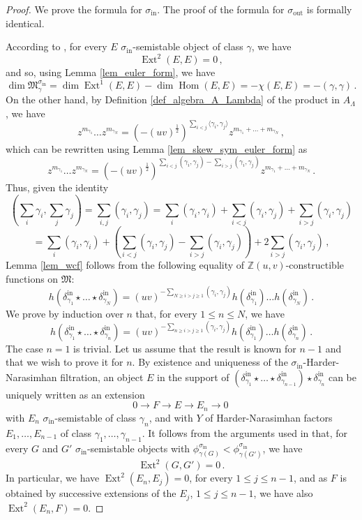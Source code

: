 \documentclass[12pt, a4paper]{amsart}
\newcommand\Z{\mathbb Z}
\newcommand\fM{\mathfrak M}
\newcommand\Ext{\operatorname{Ext}}
\newcommand\Hom{\operatorname{Hom}}
\newcommand\iin{\mathrm{in}}
\newcommand\oout{\mathrm{out}}
\begin{document}
\begin{proof}
We prove the formula for $\sigma_\iin$. The proof of the formula for $\sigma_\oout$ is formally identical.

According to \cite{MR3936077}, for every 
$E$ $\sigma_\iin$-semistable object of class $\gamma$, we have \[\Ext^2(E,E)=0\,,\] and so, using Lemma \ref{lem_euler_form}, we have
\[ \dim \fM_\gamma^{\sigma_\iin}
=\dim \Ext^1(E,E)-\dim \Hom(E,E)=-\chi(E,E)
=-(\gamma,\gamma)\,.\]
On the other hand, by Definition
\ref{def_algebra_A_Lambda} of the product in $A_\Lambda$, we have 
\[ z^{m_{\gamma_1}}\dots z^{m_{\gamma_N}}
=(-(uv)^{\frac{1}{2}})^{\sum_{i<j} \langle \gamma_i,\gamma_j \rangle} z^{m_{\gamma_1}
+\dots+m_{\gamma_N}}\,,\]
which can be rewritten using Lemma
\ref{lem_skew_sym_euler_form}
as 
\[ z^{m_{\gamma_1}}\dots z^{m_{\gamma_N}}
=(-(uv)^{\frac{1}{2}})^{\sum_{i<j}
(\gamma_i,\gamma_j) - \sum_{i>j}
(\gamma_i,\gamma_j)}
z^{m_{\gamma_1}
+\dots+m_{\gamma_N}}\,.\]
Thus, given the identity
\[ (\sum_i \gamma_i,\sum_j \gamma_j)=
\sum_{i,j}(\gamma_i,\gamma_j)
=\sum_i(\gamma_i,\gamma_i)
+\sum_{i<j}(\gamma_i,\gamma_j)
+\sum_{i>j}(\gamma_i,\gamma_j)\]
\[=\sum_i(\gamma_i,\gamma_i)
+\left(\sum_{i<j}(\gamma_i,\gamma_j)
-\sum_{i>j}(\gamma_i,\gamma_j)\right)
+2\sum_{i>j}(\gamma_i,\gamma_j)\,,\]
Lemma \ref{lem_wcf} follows from the following equality of 
$\Z(u,v)$-constructible functions on $\fM$:
\[ h(\delta_{\gamma_1}^{\iin}
\star \dots \star \delta_{\gamma_N}^{\iin})
=(uv)^{-\sum_{N \geqslant i>j \geqslant 1}(\gamma_i,\gamma_j)}
h(\delta_{\gamma_1}^\iin)
\dots h(\delta_{\gamma_N}^\iin)\,.
\]
We prove by induction over $n$ that, for every $1 \leqslant n \leqslant N$, we have
\[ h(\delta_{\gamma_1}^{\iin}
\star \dots \star \delta_{\gamma_n}^{\iin})
=(uv)^{-\sum_{n \geqslant i>j \geqslant 1}(\gamma_i,\gamma_j)}
h(\delta_{\gamma_1}^\iin)
\dots h(\delta_{\gamma_n}^\iin)\,.
\] 
The case $n=1$ is trivial. Let us assume that the result is known for $n-1$ and that we wish to prove it for $n$.
By existence and uniqueness of the 
$\sigma_\iin$-Harder-Narasimhan filtration, an object $E$ in the support of $(\delta_{\gamma_1}^{\iin}
\star \dots \star \delta_{\gamma_{n-1}}^\iin) \star \delta_{\gamma_n}^\iin$ can be uniquely written as 
an extension 
\[ 0 \rightarrow F \rightarrow E \rightarrow E_n \rightarrow 0\,\]
with $E_n$ $\sigma_\iin$-semistable of class $\gamma_n$, and with $Y$ of Harder-Narasimhan factors $E_1, \dots, E_{n-1}$ of class 
$\gamma_1, \dots, \gamma_{n-1}$.
It follows from the arguments used in \cite{MR3936077} that, for every 
$G$ and $G'$ $\sigma_\iin$-semistable objects with 
$\phi_{\gamma(G)}^{\sigma_\iin} 
<\phi_{\gamma(G')}^{\sigma_\iin}$, we have \[\Ext^2(G,G')=0\,.\]
In particular, we have $\Ext^2(E_n, E_j)=0$, for every $1\leqslant j \leqslant n-1$, and as $F$ is obtained by successive extensions of the $E_j$, $1 \leqslant j \leqslant n-1$, we have also $\Ext^2(E_n,F)=0$.


\end{proof}
\end{document}

